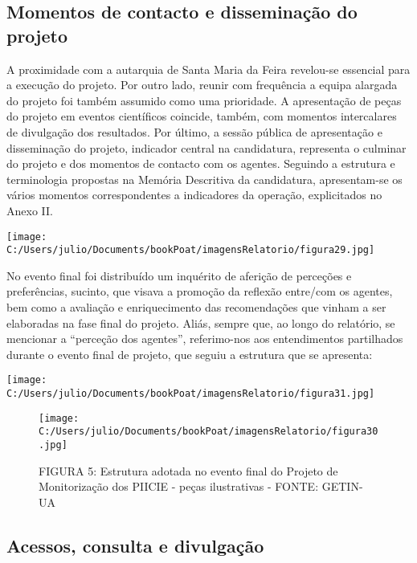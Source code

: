 \documentclass[
]{book}
\begin{document}
\hypertarget{momentos-de-contacto-e-disseminauxe7uxe3o-do-projeto}{%
\subsection{Momentos de contacto e disseminação do projeto}\label{momentos-de-contacto-e-disseminauxe7uxe3o-do-projeto}}

A proximidade com a autarquia de Santa Maria da Feira revelou-se essencial para a execução do projeto. Por outro lado, reunir com frequência a equipa alargada do projeto foi também assumido como uma prioridade. A apresentação de peças do projeto em eventos científicos coincide, também, com momentos intercalares de divulgação dos resultados. Por último, a sessão pública de apresentação e disseminação do projeto, indicador central na candidatura, representa o culminar do projeto e dos momentos de contacto com os agentes. Seguindo a estrutura e terminologia propostas na Memória Descritiva da candidatura, apresentam-se os vários momentos correspondentes a indicadores da operação, explicitados no Anexo II.

\texttt{[image: C:/Users/julio/Documents/bookPoat/imagensRelatorio/figura29.jpg]}

No evento final foi distribuído um inquérito de aferição de perceções e preferências, sucinto, que visava a promoção da reflexão entre/com os agentes, bem como a avaliação e enriquecimento das recomendações que vinham a ser elaboradas na fase final do projeto. Aliás, sempre que, ao longo do relatório, se mencionar a ``perceção dos agentes'', referimo-nos aos entendimentos partilhados durante o evento final de projeto, que seguiu a estrutura que se apresenta:

\texttt{[image: C:/Users/julio/Documents/bookPoat/imagensRelatorio/figura31.jpg]}

\begin{figure}
\centering
\texttt{[image: C:/Users/julio/Documents/bookPoat/imagensRelatorio/figura30.jpg]}
\caption{FIGURA 5: Estrutura adotada no evento final do Projeto de Monitorização dos PIICIE - peças ilustrativas - FONTE: GETIN-UA}
\end{figure}

\hypertarget{acessos-consulta-e-divulgauxe7uxe3o}{%
\subsection{Acessos, consulta e divulgação}\label{acessos-consulta-e-divulgauxe7uxe3o}}
\end{document}
